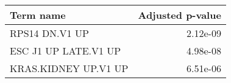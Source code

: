 \begin{tabular}{lr}
\toprule
           Term name &  Adjusted p-value \\
\midrule
      RPS14 DN.V1 UP &          2.12e-09 \\
ESC J1 UP LATE.V1 UP &          4.98e-08 \\
KRAS.KIDNEY UP.V1 UP &          6.51e-06 \\
\bottomrule
\end{tabular}
